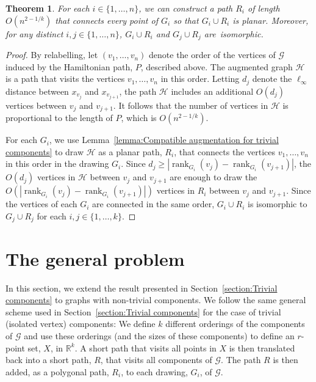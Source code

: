\documentclass[11pt]{patmorin}
\newtheorem{theorem}{Theorem}[section]
\DeclareMathOperator{\rank}{rank}
\newcommand{\R}{\mathbb{R}}
\begin{document}
\begin{theorem}\label{theorem:points}
For each $i\in \{1,\dots,n\}$, we can construct a path $R_i$ of length $O(n^{2-1/k})$ that connects every point of $G_i$ so that $G_i\cup R_i$ is planar. Moreover, for any distinct $i,j\in \{1,\dots,n\}$, $G_i\cup R_i$ and $G_j\cup R_j$ are~isomorphic.
\end{theorem}
\begin{proof}
By relabelling, let $(v_1, \ldots, v_n)$ denote the order of the vertices of $\mathcal{G}$ induced by the Hamiltonian path, $P$, described above.  The augmented graph $\mathcal{H}$ is a path that visits the vertices $v_1,\ldots,v_n$ in this order. Letting $d_j$ denote the $\ell_\infty$ distance between $x_{v_j}$ and $x_{v_{j+1}}$, the path $\mathcal{H}$ includes an additional $O(d_j)$ vertices between $v_{j}$ and $v_{j+1}$.  It follows that the number of vertices
in $\mathcal{H}$ is proportional to the length of $P$, which is $O(n^{2-1/k})$.

For each $G_i$, we use Lemma~\ref{lemma:Compatible augmentation for trivial components} to draw $\mathcal{H}$ as a planar path, $R_i$,
that connects the vertices $v_1,\ldots,v_n$ in this order in the drawing $G_i$.
Since $d_j\ge |\rank_{G_i}(v_j) - \rank_{G_i}(v_{j+1})|$, the $O(d_j)$
vertices in $\mathcal{H}$ between $v_j$ and $v_{j+1}$ are enough to
draw the $O(|\rank_{G_i}(v_j) - \rank_{G_i}(v_{j+1})|)$ vertices in $R_i$
between $v_j$ and $v_{j+1}$.
Since the vertices of each $G_i$ are connected in the same order,
$G_i\cup R_i$ is isomorphic to $G_j\cup R_j$ for each $i,j\in\{1,\ldots,k\}$.
\end{proof}


\section{The general problem}\label{section:General}
In this section, we extend the result presented in
Section~\ref{section:Trivial components} to graphs with
non-trivial components.  We follow the same general scheme used in
Section~\ref{section:Trivial components} for the case of trivial
(isolated vertex) components:  We define $k$ different
orderings of the components of $\mathcal G$ and use these orderings (and
the sizes of these components) to define an $r$-point set, $X$, in $\R^k$. A
short path that visits all points in $X$ is then translated back into
a short path, $R$, that visits all components of $\mathcal G$. The path
$R$ is then
added, as a polygonal path, $R_i$, to each drawing, $G_i$, of $\mathcal G$.
\end{document}
